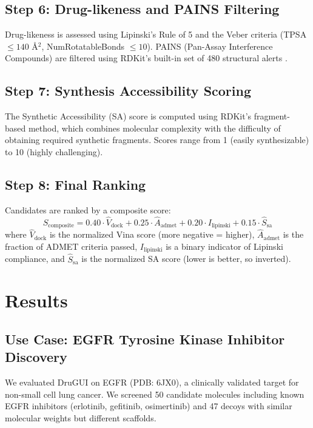 \documentclass[10pt,oneside]{article}
\begin{document}
\subsection{Step 6: Drug-likeness and PAINS Filtering}
Drug-likeness is assessed using Lipinski's Rule of 5 \citep{lipinski2001experimental} and the Veber criteria (TPSA $\leq 140$ \AA$^2$, NumRotatableBonds $\leq 10$). PAINS (Pan-Assay Interference Compounds) are filtered using RDKit's built-in set of 480 structural alerts \citep{baell2010new}.

\subsection{Step 7: Synthesis Accessibility Scoring}
The Synthetic Accessibility (SA) score is computed using RDKit's fragment-based method, which combines molecular complexity with the difficulty of obtaining required synthetic fragments. Scores range from 1 (easily synthesizable) to 10 (highly challenging).

\subsection{Step 8: Final Ranking}
Candidates are ranked by a composite score:
\begin{equation}
S_{\text{composite}} = 0.40 \cdot \hat{V}_{\text{dock}} + 0.25 \cdot \hat{A}_{\text{admet}} + 0.20 \cdot I_{\text{lipinski}} + 0.15 \cdot \hat{S}_{\text{sa}}
\label{eq:composite}
\end{equation}
where $\hat{V}_{\text{dock}}$ is the normalized Vina score (more negative = higher), $\hat{A}_{\text{admet}}$ is the fraction of ADMET criteria passed, $I_{\text{lipinski}}$ is a binary indicator of Lipinski compliance, and $\hat{S}_{\text{sa}}$ is the normalized SA score (lower is better, so inverted).

\section{Results}

\subsection{Use Case: EGFR Tyrosine Kinase Inhibitor Discovery}

We evaluated DruGUI on EGFR (PDB: 6JX0), a clinically validated target for non-small cell lung cancer. We screened 50 candidate molecules including known EGFR inhibitors (erlotinib, gefitinib, osimertinib) and 47 decoys with similar molecular weights but different scaffolds.
\end{document}
